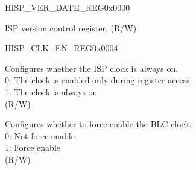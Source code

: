 \begin{register}{H}{ISP\_VER\_DATE\_REG}{0x0000}\label{regdesc:ISPVERDATEREG}
%
\regnewline%
\begin{regdesc}\begin{reglist}
\label{fielddesc:ISPVERDATA}\item [ISP\_VER\_DATA] ISP version control register. (R/W)
\end{reglist}\end{regdesc}
\end{register}


\begin{register}{H}{ISP\_CLK\_EN\_REG}{0x0004}\label{regdesc:ISPCLKENREG}
%
%
%
%
%
%
%
%
%
%
%
%
%
%
%
%
%
%
%
%
%
%
\regnewline%
\begin{regdesc}\begin{reglist}
\label{fielddesc:ISPCLKEN}\item [ISP\_CLK\_EN] Configures whether the ISP clock is always on.\\0: The clock is enabled only during register access\\1: The clock is always on\\(R/W)
\label{fielddesc:ISPCLKBLCFORCEON}\item [ISP\_CLK\_BLC\_FORCE\_ON] Configures whether to force enable the BLC clock.\\0: Not force enable\\1: Force enable\\(R/W)

\end{reglist}
\end{regdesc}
\end{register}
